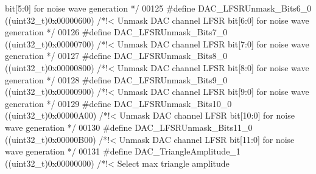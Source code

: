 \begin{DoxyCode}
{       bit[5:0] for noise wave generation */}
00125 \textcolor{preprocessor}{#}\textcolor{preprocessor}{define} \textcolor{preprocessor}{DAC\_LFSRUnmask\_Bits6\_0}             \textcolor{preprocessor}{(}\textcolor{preprocessor}{(}\textcolor{preprocessor}{uint32\_t}\textcolor{preprocessor}{)}0x00000600\textcolor{preprocessor}{)} \textcolor{comment}{/*!< Unmask DAC channel LFSR
       bit[6:0] for noise wave generation */}
00126 \textcolor{preprocessor}{#}\textcolor{preprocessor}{define} \textcolor{preprocessor}{DAC\_LFSRUnmask\_Bits7\_0}             \textcolor{preprocessor}{(}\textcolor{preprocessor}{(}\textcolor{preprocessor}{uint32\_t}\textcolor{preprocessor}{)}0x00000700\textcolor{preprocessor}{)} \textcolor{comment}{/*!< Unmask DAC channel LFSR
       bit[7:0] for noise wave generation */}
00127 \textcolor{preprocessor}{#}\textcolor{preprocessor}{define} \textcolor{preprocessor}{DAC\_LFSRUnmask\_Bits8\_0}             \textcolor{preprocessor}{(}\textcolor{preprocessor}{(}\textcolor{preprocessor}{uint32\_t}\textcolor{preprocessor}{)}0x00000800\textcolor{preprocessor}{)} \textcolor{comment}{/*!< Unmask DAC channel LFSR
       bit[8:0] for noise wave generation */}
00128 \textcolor{preprocessor}{#}\textcolor{preprocessor}{define} \textcolor{preprocessor}{DAC\_LFSRUnmask\_Bits9\_0}             \textcolor{preprocessor}{(}\textcolor{preprocessor}{(}\textcolor{preprocessor}{uint32\_t}\textcolor{preprocessor}{)}0x00000900\textcolor{preprocessor}{)} \textcolor{comment}{/*!< Unmask DAC channel LFSR
       bit[9:0] for noise wave generation */}
00129 \textcolor{preprocessor}{#}\textcolor{preprocessor}{define} \textcolor{preprocessor}{DAC\_LFSRUnmask\_Bits10\_0}            \textcolor{preprocessor}{(}\textcolor{preprocessor}{(}\textcolor{preprocessor}{uint32\_t}\textcolor{preprocessor}{)}0x00000A00\textcolor{preprocessor}{)} \textcolor{comment}{/*!< Unmask DAC channel LFSR
       bit[10:0] for noise wave generation */}
00130 \textcolor{preprocessor}{#}\textcolor{preprocessor}{define} \textcolor{preprocessor}{DAC\_LFSRUnmask\_Bits11\_0}            \textcolor{preprocessor}{(}\textcolor{preprocessor}{(}\textcolor{preprocessor}{uint32\_t}\textcolor{preprocessor}{)}0x00000B00\textcolor{preprocessor}{)} \textcolor{comment}{/*!< Unmask DAC channel LFSR
       bit[11:0] for noise wave generation */}
00131 \textcolor{preprocessor}{#}\textcolor{preprocessor}{define} \textcolor{preprocessor}{DAC\_TriangleAmplitude\_1}            \textcolor{preprocessor}{(}\textcolor{preprocessor}{(}\textcolor{preprocessor}{uint32\_t}\textcolor{preprocessor}{)}0x00000000\textcolor{preprocessor}{)} \textcolor{comment}{/*!< Select max triangle amplitude
}
\end{DoxyCode}
